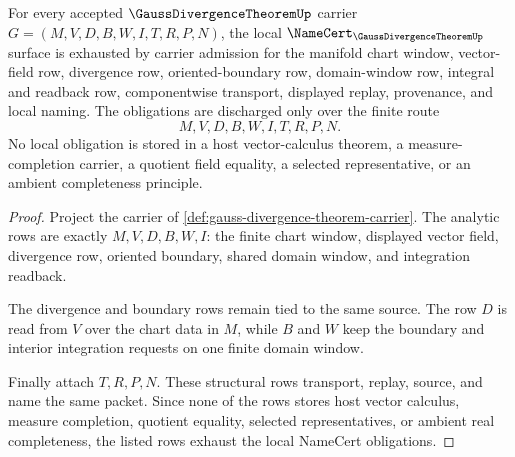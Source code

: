 \begin{theorem}
\label{thm:gauss-divergence-theorem-namecert-obligations}
For every accepted $\GaussDivergenceTheoremUp$ carrier $G=(M,V,D,B,W,I,T,R,P,N)$, the local $\NameCert_{\GaussDivergenceTheoremUp}$ surface is exhausted by carrier admission for the manifold chart window, vector-field row, divergence row, oriented-boundary row, domain-window row, integral and readback row, componentwise transport, displayed replay, provenance, and local naming. The obligations are discharged only over the finite route
$$
M,V,D,B,W,I,T,R,P,N .
$$
No local obligation is stored in a host vector-calculus theorem, a measure-completion carrier, a quotient field equality, a selected representative, or an ambient completeness principle.
\end{theorem}
\begin{proof}
Project the carrier of \autoref{def:gauss-divergence-theorem-carrier}. The analytic rows are exactly $M,V,D,B,W,I$: the finite chart window, displayed vector field, divergence row, oriented boundary, shared domain window, and integration readback.

The divergence and boundary rows remain tied to the same source. The row $D$ is read from $V$ over the chart data in $M$, while $B$ and $W$ keep the boundary and interior integration requests on one finite domain window.

Finally attach $T,R,P,N$. These structural rows transport, replay, source, and name the same packet. Since none of the rows stores host vector calculus, measure completion, quotient equality, selected representatives, or ambient real completeness, the listed rows exhaust the local NameCert obligations.
\end{proof}

